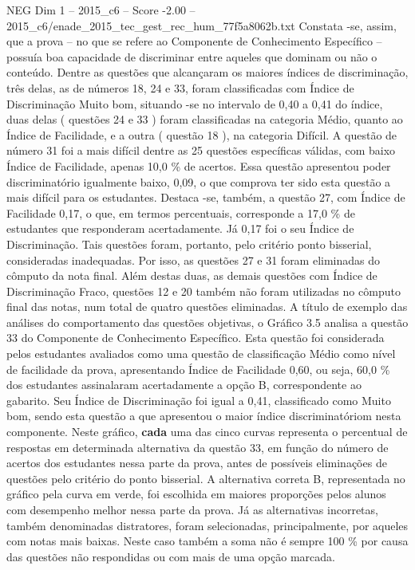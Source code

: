 \begin{textsample}{NEG Dim 1 – 2015\_c6 – Score -2.00 – 2015\_c6/enade\_2015\_tec\_gest\_rec\_hum\_77f5a8062b.txt}
Constata -se, assim, que a prova – no que se refere ao Componente de Conhecimento Específico – possuía boa capacidade de discriminar entre aqueles que dominam ou não o conteúdo.
Dentre as questões que alcançaram os maiores índices de discriminação, três delas, as de números 18, 24 e 33, foram classificadas com Índice de Discriminação Muito bom, situando -se no intervalo de 0,40 a 0,41 do índice, duas delas ( questões 24 e 33 ) foram classificadas na categoria Médio, quanto ao Índice de Facilidade, e a outra ( questão 18 ), na categoria Difícil.
A questão de número 31 foi a mais difícil dentre as 25 questões específicas válidas, com baixo Índice de Facilidade, apenas 10,0 \% de acertos.
Essa questão apresentou poder discriminatório igualmente baixo, 0,09, o que comprova ter sido esta questão a mais difícil para os estudantes.
Destaca -se, também, a questão 27, com Índice de Facilidade 0,17, o que, em termos percentuais, corresponde a 17,0 \% de estudantes que responderam acertadamente.
Já 0,17 foi o seu Índice de Discriminação.
Tais questões foram, portanto, pelo critério ponto bisserial, consideradas inadequadas.
Por isso, as questões 27 e 31 foram eliminadas do cômputo da nota final.
Além destas duas, as demais questões com Índice de Discriminação Fraco, questões 12 e 20 também não foram utilizadas no cômputo final das notas, num total de quatro questões eliminadas.
A título de exemplo das análises do comportamento das questões objetivas, o Gráfico 3.5 analisa a questão 33 do Componente de Conhecimento Específico.
Esta questão foi considerada pelos estudantes avaliados como uma questão de classificação Médio como nível de facilidade da prova, apresentando Índice de Facilidade 0,60, ou seja, 60,0 \% dos estudantes assinalaram acertadamente a opção B, correspondente ao gabarito.
Seu Índice de Discriminação foi igual a 0,41, classificado como Muito bom, sendo esta questão a que apresentou o maior índice discriminatóriom nesta componente.
Neste gráfico, \textbf{cada} uma das cinco curvas representa o percentual de respostas em determinada alternativa da questão 33, em função do número de acertos dos estudantes nessa parte da prova, antes de possíveis eliminações de questões pelo critério do ponto bisserial.
A alternativa correta B, representada no gráfico pela curva em verde, foi escolhida em maiores proporções pelos alunos com desempenho melhor nessa parte da prova.
Já as alternativas incorretas, também denominadas distratores, foram selecionadas, principalmente, por aqueles com notas mais baixas.
Neste caso também a soma não é sempre 100 \% por causa das questões não respondidas ou com mais de uma opção marcada.

\end{textsample}
